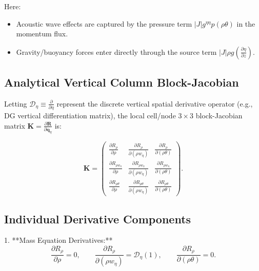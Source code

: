 \documentclass[11pt,a4paper]{article}
\begin{document}
	Here:
	\begin{itemize}
		\item Acoustic wave effects are captured by the pressure term $|J| g^{\eta\eta} p(\rho\theta)$ in the momentum flux.
		\item Gravity/buoyancy forces enter directly through the source term $|J| \rho g \left( \frac{\partial \eta}{\partial z} \right)$.
	\end{itemize}
	
	
	\subsection{Analytical Vertical Column Block-Jacobian}
	
	Letting $\mathcal{D}_\eta \equiv \frac{\partial}{\partial \eta}$ represent the discrete vertical spatial derivative operator (e.g., DG vertical differentiation matrix), the local cell/node $3 \times 3$ block-Jacobian matrix $\mathbf{K} = \frac{\partial \mathbf{R}}{\partial \boldsymbol{q}_\eta}$ is:
	
	\begin{equation}
		\mathbf{K} = \begin{pmatrix}
			\frac{\partial R_\rho}{\partial \rho} & \frac{\partial R_\rho}{\partial (\rho w_\eta)} & \frac{\partial R_\rho}{\partial (\rho \theta)} \\[10pt]
			\frac{\partial R_{\rho w_\eta}}{\partial \rho} & \frac{\partial R_{\rho w_\eta}}{\partial (\rho w_\eta)} & \frac{\partial R_{\rho w_\eta}}{\partial (\rho \theta)} \\[10pt]
			\frac{\partial R_{\rho \theta}}{\partial \rho} & \frac{\partial R_{\rho \theta}}{\partial (\rho w_\eta)} & \frac{\partial R_{\rho \theta}}{\partial (\rho \theta)}
		\end{pmatrix}.
	\end{equation}
	
	\subsection{Individual Derivative Components}
	
	1. **Mass Equation Derivatives:**
	\begin{equation}
		\frac{\partial R_\rho}{\partial \rho} = 0, \qquad 
		\frac{\partial R_\rho}{\partial (\rho w_\eta)} = \mathcal{D}_\eta(1), \qquad 
		\frac{\partial R_\rho}{\partial (\rho \theta)} = 0.
	\end{equation}
	
\end{document}
